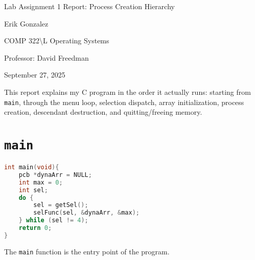 \documentclass[12pt]{article}
\begin{document}
\begin{titlepage}
\centering
\vspace*{\fill}

{\LARGE Lab Assignment 1 Report: Process Creation Hierarchy \par}
\vspace{1cm}
{\large Erik Gonzalez \par}
COMP 322\textbackslash L Operating Systems \par
Professor: David Freedman \par
September 27, 2025\vspace{2cm}


This report explains my C program in the order it actually runs: starting from 
\texttt{main}, through the menu loop, selection dispatch, array initialization, 
process creation, descendant destruction, and quitting/freeing memory.

\vspace*{\fill}
\end{titlepage}
\newpage
\section*{\texttt{main}}
\begin{lstlisting}[language=C]
int main(void){
    pcb *dynaArr = NULL;
    int max = 0;
    int sel;
    do {
        sel = getSel();
        selFunc(sel, &dynaArr, &max);
    } while (sel != 4);
    return 0;
}
\end{lstlisting}

The \texttt{main} function is the entry point of the program.
\end{document}
